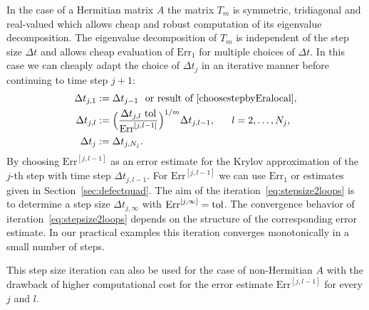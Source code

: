 \documentclass[smallextended]{svjour3pre}%
\numberwithin{equation}{section}
\numberwithin{figure}{section}
\numberwithin{table}{section}
\newcommand{\ttol}{{\rm tol}}
\newcommand\tjnew[1]{{#1}}
\newcommand\Erone{\mathrm{Err}_1}
\newcommand\Er{\mathrm{Err}}
\newcommand\Opgen{A}
\begin{document}
\begin{remark}\label{reqmark:stepsizeiteration}
In the case of a Hermitian matrix $\Opgen$ the matrix $T_m$ is symmetric, tridiagonal and real-valued which allows cheap and robust computation of its eigenvalue decomposition.
The eigenvalue decomposition of $T_m$ is independent of the step size $\Delta t$ and allows cheap evaluation of $\Erone$ for multiple choices of $\Delta t$.
In this case we can cheaply adapt the choice of $\Delta t_j$ in an iterative manner before continuing to time step $j+1$:
\begin{equation}\label{eq:stepsize2loops}
\begin{aligned}
\Delta t_{j,1}&:= \Delta t_{j-1}~~\text{or result of~\eqref{choosestepbyEralocal}},\\
\Delta t_{j,l}&:= \Big( \frac{\tjnew{\Delta t_{j,l}}\,\,\ttol}{\Er^{[j,l-1]}}\Big)^{1/m} \Delta t_{j,l-1},~~~~~ l=2,\ldots,N_j,\\
\Delta t_{j}&:=\Delta t_{j,N_j}.\\
\end{aligned}
\end{equation}
%
By choosing $\Er^{[j,l-1]}$ as an error estimate for
the Krylov approximation of the $j$-th step
with time step $\Delta t_{j,l-1}$.
For $\Er^{[j,l-1]}$ we can use $\Erone$ or estimates given in Section~\ref{sec:defectquad}.
%
The aim of the iteration~\eqref{eq:stepsize2loops} is to determine a step size $\Delta t_{j,\infty}$ with $\Er^{[j,\infty]}=\ttol$.
The convergence behavior of iteration~\eqref{eq:stepsize2loops} depends on the structure of the corresponding error estimate.
In our practical examples this iteration converges monotonically in a small number of steps.

This step size iteration can also be used for the case of non-Hermitian $\Opgen$ with the drawback of higher computational cost for the error estimate $\Er^{[j,l-1]}$ for every $j$ and $l$.
\end{remark}
\end{document}
